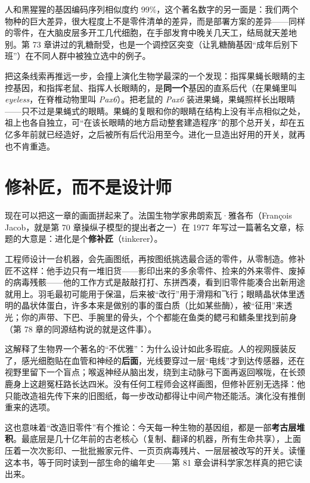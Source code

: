 人和黑猩猩的基因编码序列相似度约 99\%，这个著名数字的另一面是：我们两个物种的巨大差异，很大程度上不是零件清单的差异，而是部署方案的差异——同样的零件，在大脑皮层多开工几代细胞，在手部发育中晚关几天工，结局就天差地别。第 73 章讲过的乳糖耐受，也是一个调控区突变（让乳糖酶基因“成年后别下班”）在不同人群中被独立选中的例子。

把这条线索再推远一步，会撞上演化生物学最深的一个发现：指挥果蝇长眼睛的主控基因，和指挥老鼠、指挥人长眼睛的，是\textbf{同一个}基因的直系后代（在果蝇里叫 \emph{eyeless}，在脊椎动物里叫 \emph{Pax6}）。把老鼠的 \emph{Pax6} 装进果蝇，果蝇照样长出眼睛——只不过是果蝇式的眼睛。果蝇的复眼和你的眼睛在结构上没有半点相似之处，祖上也各自独立，可“在该长眼睛的地方启动整套建造程序”的那个总开关，却在五亿多年前就已经造好，之后被所有后代沿用至今。进化一旦造出好用的开关，就再也不肯重造。

\section{修补匠，而不是设计师}

现在可以把这一章的画面拼起来了。法国生物学家弗朗索瓦·雅各布（François Jacob，就是第 70 章操纵子模型的提出者之一）在 1977 年写过一篇著名文章，标题的大意是：进化是个\textbf{修补匠}（tinkerer）。

工程师设计一台机器，会先画图纸，再按图纸挑选最合适的零件，从零制造。修补匠不这样：他手边只有一堆旧货——影印出来的多余零件、捡来的外来零件、废掉的病毒残骸——他的工作方式是敲敲打打、东拼西凑，看到旧零件能凑合出新用途就用上。羽毛最初可能用于保温，后来被“改行”用于滑翔和飞行；眼睛晶状体里透明的晶状体蛋白，许多本来是做别的事的蛋白质（比如某些酶），被“征用”来透光；你的声带、下巴、手腕里的骨头，个个都能在鱼类的鳃弓和鳍条里找到前身（第 78 章的同源结构说的就是这件事）。

这解释了生物界一个著名的“不优雅”：为什么设计如此多瑕疵。人的视网膜装反了，感光细胞贴在血管和神经的\textbf{后面}，光线要穿过一层“电线”才到达传感器，还在视野里留下一个盲点；喉返神经从脑出发，绕到主动脉弓下面再返回喉咙，在长颈鹿身上这趟冤枉路长达四米。没有任何工程师会这样画图，但修补匠别无选择：他只能改造祖先传下来的旧图纸，每一步改动都得让中间产物还能活。演化没有推倒重来的选项。

这也意味着“改造旧零件”有个推论：今天每一种生物的基因组，都是一部\textbf{考古层堆积}。最底层是几十亿年前的古老核心（复制、翻译的机器，所有生命共享），上面压着一次次影印、一批批搬家元件、一页页病毒残片、一层层被改写的开关。读懂这本书，等于同时读到一部生命的编年史——第 81 章会讲科学家怎样真的把它读出来。

